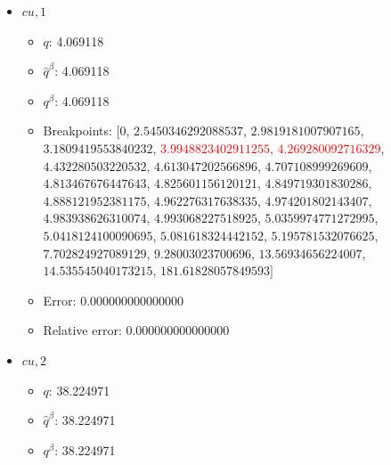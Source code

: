 \documentclass{article}%
\begin{document}
\begin{itemize}
	\begin{itemize}%
		\item $q$: 127.076903%
		\item $\hat{q}^\beta$: 127.076903%
		\item $q^\beta$: 127.076903%
		\item Breakpoints: $[$$0$, $9.898970403313276$, $28.333333333333332$, $42.69900440382105$, $48.67452649027746$, $79.83702775273511$, $87.16107999267206$, \textcolor{red}{$118.88765652962957$}, \textcolor{red}{$128.52021081477858$}, $131.69760457629607$, $132.12228195956155$, $135.81963163113545$, $137.02923097052596$, $138.86359281280824$, $139.47623233772285$, $140.31685261310218$, $140.7008934199032$, $141.79783607898793$, $142.4338700260237$, $143.30274961189664$, $144.67005099128556$, $144.70843093515643$, $147.02575214945074$, $147.07009017600456$, $147.48374761404892$, $149.84689443310864$, $720.0$$]$%
		\item Error: 0.000000000000000%
		\item Relative error: 0.000000000000000%
	\end{itemize}%
	\item $\textit{cu},1$%
	\begin{itemize}%
		\item $q$: 4.069118%
		\item $\hat{q}^\beta$: 4.069118%
		\item $q^\beta$: 4.069118%
		\item Breakpoints: $[$$0$, $2.5450346292088537$, $2.9819181007907165$, $3.1809419553840232$, \textcolor{red}{$3.9948823402911255$}, \textcolor{red}{$4.269280092716329$}, $4.432280503220532$, $4.613047202566896$, $4.707108999269609$, $4.813467676447643$, $4.825601156120121$, $4.849719301830286$, $4.888121952381175$, $4.962276317638335$, $4.974201802143407$, $4.983938626310074$, $4.993068227518925$, $5.0359974771272995$, $5.0418124100090695$, $5.081618324442152$, $5.195781532076625$, $7.702824927089129$, $9.28003023700696$, $13.56934656224007$, $14.535545040173215$, $181.61828057849593$$]$%
		\item Error: 0.000000000000000%
		\item Relative error: 0.000000000000000%
	\end{itemize}%
	\item $\textit{cu},2$%
	\begin{itemize}%
		\item $q$: 38.224971%
		\item $\hat{q}^\beta$: 38.224971%
		\item $q^\beta$: 38.224971%

\end{itemize}
\end{itemize}
\end{document}
